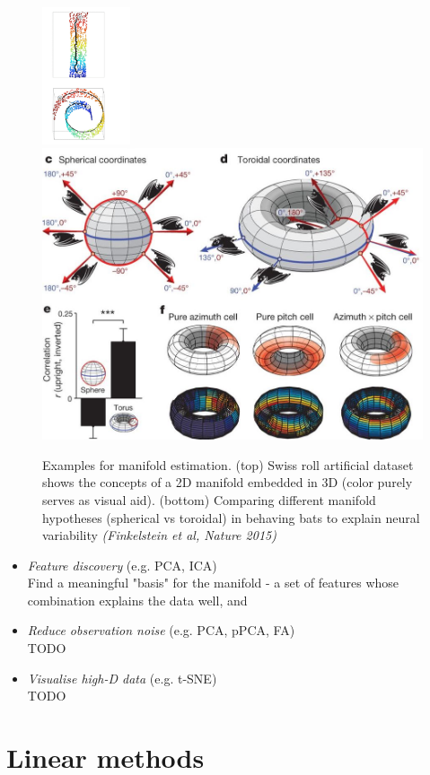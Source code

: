 \documentclass[11pt]{article}
\begin{document}
\begin{figure}[h!]
\centering
\hspace{-4cm}\includegraphics[angle=-90,origin=c, height=0.7\linewidth, width=0.23\textwidth]{swiss-unroll-distance}
\\ \vspace{-7cm}
\includegraphics[width=0.5\linewidth]{bat_neurons_nature14031-f3} 
\caption{Examples for manifold estimation. (top) Swiss roll artificial dataset shows the concepts of a 2D manifold embedded in 3D (color purely serves as visual aid). (bottom) Comparing different manifold hypotheses (spherical vs toroidal) in behaving bats to explain neural variability \emph{(Finkelstein et al, Nature 2015)}}
\end{figure} 


\begin{itemize}
	\item \emph{Feature discovery} (e.g. PCA, ICA) \\ Find a meaningful "basis" for the manifold - a set of features whose combination explains the data well, and 
\end{itemize}

\begin{itemize}
	\item \emph{Reduce observation noise} (e.g. PCA, pPCA, FA) \\ TODO
\end{itemize}

\begin{itemize}
	\item \emph{Visualise high-D data} (e.g. t-SNE) \\ TODO
\end{itemize}


\section{Linear methods}

\end{document}

